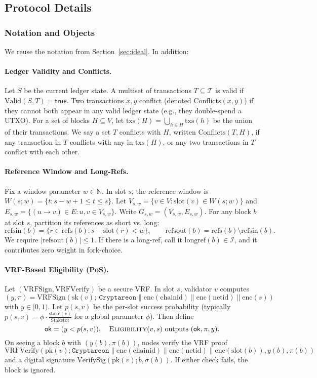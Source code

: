 \documentclass[11pt]{article}
\newcommand{\Tx}{\ensuremath{\mathcal{T}}\xspace}
\newcommand{\Id}{\ensuremath{\mathcal{I}}\xspace}
\newcommand{\pk}{\ensuremath{\mathrm{pk}}\xspace}
\newcommand{\sk}{\ensuremath{\mathrm{sk}}\xspace}
\newcommand{\stake}{\ensuremath{\mathrm{stake}}\xspace}
\newcommand{\StakeTot}{\ensuremath{\mathrm{Stake}{\mathrm{tot}}}\xspace}
\newcommand{\stakefrac}[1]{\ensuremath{\frac{\stake(#1)}{\StakeTot}}\xspace}
\newcommand{\slot}{\ensuremath{\mathrm{slot}}\xspace}
\newcommand{\txs}{\ensuremath{\mathrm{txs}}\xspace}
\newcommand{\refs}{\ensuremath{\mathrm{refs}}\xspace}
\newcommand{\shortrefs}{\ensuremath{\mathrm{refs}{\mathrm{in}}}\xspace}
\newcommand{\longrefs}{\ensuremath{\mathrm{refs}{\mathrm{out}}}\xspace}
\newcommand{\longref}{\ensuremath{\mathrm{longref}}\xspace}
\newcommand{\Valid}{\ensuremath{\mathrm{Valid}}\xspace}
\newcommand{\Conflicts}{\ensuremath{\mathrm{Conflicts}}\xspace}
\newcommand{\Eligibility}{\ensuremath{\textsc{Eligibility}}\xspace}
\newcommand{\VRFSign}{\ensuremath{\mathrm{VRFSign}}\xspace}
\newcommand{\VRFVerify}{\ensuremath{\mathrm{VRFVerify}}\xspace}
\newcommand{\VerifySig}{\ensuremath{\mathrm{VerifySig}}\xspace}
\newcommand{\domsep}{\ensuremath{\mathtt{Cryptareon}}\xspace}
\newcommand{\chainid}{\ensuremath{\mathrm{chainid}}\xspace}
\newcommand{\netid}{\ensuremath{\mathrm{netid}}\xspace}
\newcommand{\Encode}{\ensuremath{\mathrm{enc}}\xspace}
\begin{document}

\subsection{Protocol Details}

\subsubsection{Notation and Objects}
\label{subsec:notation}
We reuse the notation from Section~\ref{sec:ideal}. In addition:
\paragraph{Ledger Validity and Conflicts.}
Let $S$ be the current ledger state. A multiset of transactions $T\subseteq \Tx$ is valid if $\Valid(S,T)=\textsf{true}$. Two transactions $x,y$ conflict (denoted $\Conflicts(x,y)$) if they cannot both appear in any valid ledger state (e.g., they double-spend a UTXO). For a set of blocks $H\subseteq V$, let $\txs(H)=\bigcup_{h\in H}\txs(h)$ be the union of their transactions. We say a set $T$ conflicts with $H$, written $\Conflicts(T,H)$, if any transaction in $T$ conflicts with any in $\txs(H)$, or any two transactions in $T$ conflict with each other.

\paragraph{Reference Window and Long-Refs.}
Fix a window parameter $w\in\mathbb{N}$. In slot $s$, the reference window is $W(s;w)=\{t: s-w+1\le t \le s\}$. Let $V_{s,w}=\{v\in V: \slot(v)\in W(s;w)\}$ and $E_{s,w}=\{(u\to v)\in E: u,v\in V_{s,w}\}$. Write $G_{s,w}=(V_{s,w},E_{s,w})$. For any block $b$ at slot $s$, partition its references as short vs. long:
\begin{equation*}
\shortrefs(b)=\{r\in\refs(b): s-\slot(r)<w\}, \qquad
\longrefs(b)=\refs(b)\setminus\shortrefs(b).
\end{equation*}
We require $|\longrefs(b)|\le1$. If there is a long-ref, call it $\longref(b)\in\Id$, and it contributes zero weight in fork-choice.

\paragraph{VRF-Based Eligibility (PoS).}
Let $(\VRFSign,\VRFVerify)$ be a secure VRF. In slot $s$, validator $v$ computes $(y,\pi)=\VRFSign(\sk(v);\ \domsep\|\Encode(\chainid)\|\Encode(\netid)\|\Encode(s))$ with $y\in[0,1)$. Let $p(s,v)$ be the per-slot success probability (typically $p(s,v)=\phi\cdot\stakefrac{v}$ for a global parameter $\phi$). Then define
\begin{equation*}
\mathsf{ok} = (y < p(s,v)),\quad \Eligibility(v,s)\text{ outputs }(\mathsf{ok},\pi,y).
\end{equation*}
On seeing a block $b$ with $(y(b),\pi(b))$, nodes verify the VRF proof $$\VRFVerify(\pk(v);\allowbreak \domsep\|\Encode(\chainid)\|\Encode(\netid)\|\Encode(\slot(b)), y(b), \pi(b))$$ and a digital signature $\VerifySig(\pk(v); b, \sigma(b))$. If either check fails, the block is ignored.
\end{document}
